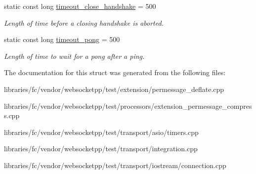 \begin{DoxyCompactItemize}
static const long \mbox{\hyperlink{classconfig_a72a7ba41094b21293a0fa92634501dfa}{timeout\+\_\+close\+\_\+handshake}} = 500
\begin{DoxyCompactList}\small\item\em Length of time before a closing handshake is aborted. \end{DoxyCompactList}\item 
\mbox{\label{classconfig_a4e28a7b5922f4a8b15c83ff7196bce28}} 
static const long \mbox{\hyperlink{classconfig_a4e28a7b5922f4a8b15c83ff7196bce28}{timeout\+\_\+pong}} = 500
\begin{DoxyCompactList}\small\item\em Length of time to wait for a pong after a ping. \end{DoxyCompactList}\end{DoxyCompactItemize}


The documentation for this struct was generated from the following files\+:\begin{DoxyCompactItemize}
\item 
libraries/fc/vendor/websocketpp/test/extension/permessage\+\_\+deflate.\+cpp\item 
libraries/fc/vendor/websocketpp/test/processors/extension\+\_\+permessage\+\_\+compress.\+cpp\item 
libraries/fc/vendor/websocketpp/test/transport/asio/timers.\+cpp\item 
libraries/fc/vendor/websocketpp/test/transport/integration.\+cpp\item 
libraries/fc/vendor/websocketpp/test/transport/iostream/connection.\+cpp\end{DoxyCompactItemize}
